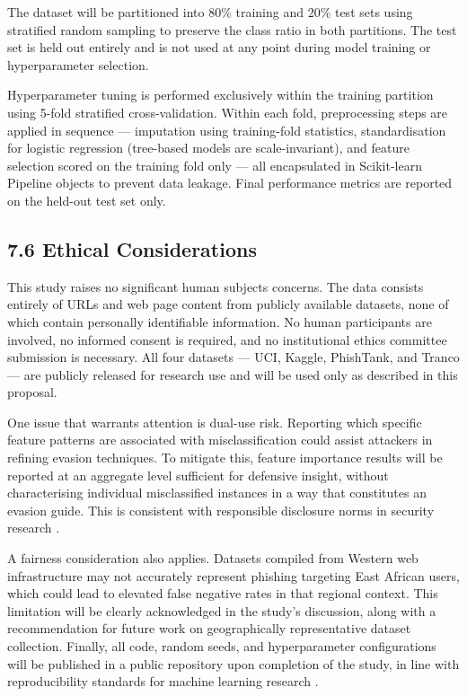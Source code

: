 \documentclass[11pt,letterpaper]{article}
\begin{document}
The dataset will be partitioned into 80\% training and 20\% test sets using stratified random sampling to preserve the class ratio in both partitions. The test set is held out entirely and is not used at any point during model training or hyperparameter selection.

Hyperparameter tuning is performed exclusively within the training partition using 5-fold stratified cross-validation. Within each fold, preprocessing steps are applied in sequence --- imputation using training-fold statistics, standardisation for logistic regression (tree-based models are scale-invariant), and feature selection scored on the training fold only --- all encapsulated in Scikit-learn Pipeline objects to prevent data leakage. Final performance metrics are reported on the held-out test set only.

\subsection*{7.6 Ethical Considerations}

This study raises no significant human subjects concerns. The data consists entirely of URLs and web page content from publicly available datasets, none of which contain personally identifiable information. No human participants are involved, no informed consent is required, and no institutional ethics committee submission is necessary. All four datasets --- UCI, Kaggle, PhishTank, and Tranco --- are publicly released for research use and will be used only as described in this proposal.

One issue that warrants attention is dual-use risk. Reporting which specific feature patterns are associated with misclassification could assist attackers in refining evasion techniques. To mitigate this, feature importance results will be reported at an aggregate level sufficient for defensive insight, without characterising individual misclassified instances in a way that constitutes an evasion guide. This is consistent with responsible disclosure norms in security research \cite{anderson2020}.

A fairness consideration also applies. Datasets compiled from Western web infrastructure may not accurately represent phishing targeting East African users, which could lead to elevated false negative rates in that regional context. This limitation will be clearly acknowledged in the study's discussion, along with a recommendation for future work on geographically representative dataset collection. Finally, all code, random seeds, and hyperparameter configurations will be published in a public repository upon completion of the study, in line with reproducibility standards for machine learning research \cite{gundersen2018}.
\end{document}
